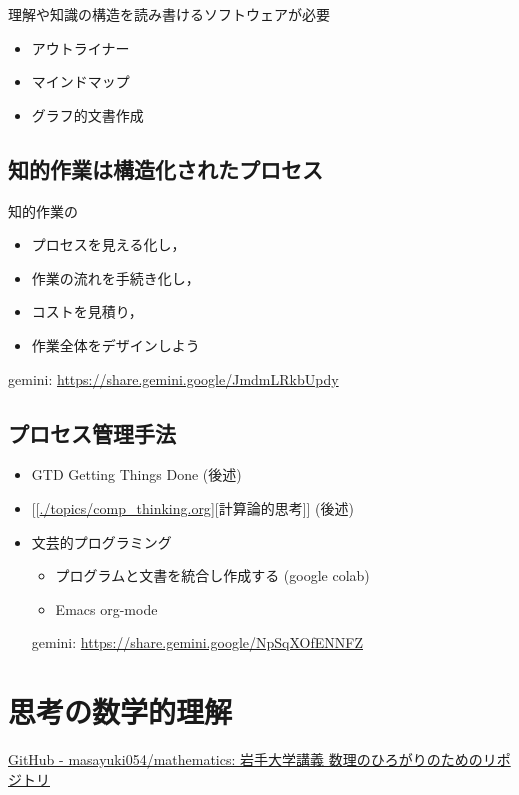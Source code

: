 \documentclass[dvipdfmx,11pat]{jarticle}
\begin{document}
理解や知識の構造を読み書けるソフトウェアが必要
\begin{itemize}
\item アウトライナー
\item マインドマップ
\item グラフ的文書作成
\end{itemize}
\subsection{知的作業は構造化されたプロセス}
\label{sec:orgbe9bcf3}

知的作業の
\begin{itemize}
\item プロセスを見える化し，
\item 作業の流れを手続き化し，
\item コストを見積り，
\item 作業全体をデザインしよう
\end{itemize}

gemini: \url{https://share.gemini.google/JmdmLRkbUpdy} 
\subsection{プロセス管理手法}
\label{sec:org9203794}
\begin{itemize}
\item GTD Getting Things Done (後述)
\item {[}[\url{./topics/comp\_thinking.org}][計算論的思考]] (後述)

\item 文芸的プログラミング
\begin{itemize}
\item プログラムと文書を統合し作成する (google colab)
\item Emacs org-mode
\end{itemize}

gemini: \url{https://share.gemini.google/NpSqXOfENNFZ}
\end{itemize}
\section{思考の数学的理解}
\label{sec:orgf6d9f54}
\href{https://github.com/masayuki054/mathematics/tree/main}{GitHub - masayuki054/mathematics: 岩手大学講義 数理のひろがりのためのリポジトリ}
\end{document}
